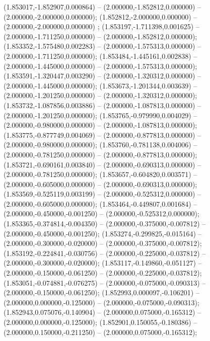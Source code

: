  (1.853017,-1.852907,0.000864) -- (2.000000,-1.852812,0.000000) -- (2.000000,-2.000000,0.000000);
 (1.852812,-2.000000,0.000000) -- (2.000000,-2.000000,0.000000) ;
 (1.853197,-1.711398,0.001625) -- (2.000000,-1.711250,0.000000) -- (2.000000,-1.852812,0.000000);
 (1.853352,-1.575480,0.002283) -- (2.000000,-1.575313,0.000000) -- (2.000000,-1.711250,0.000000);
 (1.853484,-1.445161,0.002838) -- (2.000000,-1.445000,0.000000) -- (2.000000,-1.575313,0.000000);
 (1.853591,-1.320447,0.003290) -- (2.000000,-1.320312,0.000000) -- (2.000000,-1.445000,0.000000);
 (1.853673,-1.201344,0.003639) -- (2.000000,-1.201250,0.000000) -- (2.000000,-1.320312,0.000000);
 (1.853732,-1.087856,0.003886) -- (2.000000,-1.087813,0.000000) -- (2.000000,-1.201250,0.000000);
 (1.853765,-0.979990,0.004029) -- (2.000000,-0.980000,0.000000) -- (2.000000,-1.087813,0.000000);
 (1.853775,-0.877749,0.004069) -- (2.000000,-0.877813,0.000000) -- (2.000000,-0.980000,0.000000);
 (1.853760,-0.781138,0.004006) -- (2.000000,-0.781250,0.000000) -- (2.000000,-0.877813,0.000000);
 (1.853721,-0.690161,0.003840) -- (2.000000,-0.690313,0.000000) -- (2.000000,-0.781250,0.000000);
 (1.853657,-0.604820,0.003571) -- (2.000000,-0.605000,0.000000) -- (2.000000,-0.690313,0.000000);
 (1.853569,-0.525119,0.003199) -- (2.000000,-0.525312,0.000000) -- (2.000000,-0.605000,0.000000);
 (1.853464,-0.449807,0.001684) -- (2.000000,-0.450000,-0.001250) -- (2.000000,-0.525312,0.000000);
 (1.853365,-0.374814,-0.004350) -- (2.000000,-0.375000,-0.007812) -- (2.000000,-0.450000,-0.001250);
 (1.853274,-0.299825,-0.015164) -- (2.000000,-0.300000,-0.020000) -- (2.000000,-0.375000,-0.007812);
 (1.853192,-0.224841,-0.030756) -- (2.000000,-0.225000,-0.037812) -- (2.000000,-0.300000,-0.020000);
 (1.853117,-0.149860,-0.051127) -- (2.000000,-0.150000,-0.061250) -- (2.000000,-0.225000,-0.037812);
 (1.853051,-0.074881,-0.076275) -- (2.000000,-0.075000,-0.090313) -- (2.000000,-0.150000,-0.061250);
 (1.852993,0.000097,-0.106201) -- (2.000000,0.000000,-0.125000) -- (2.000000,-0.075000,-0.090313);
 (1.852943,0.075076,-0.140904) -- (2.000000,0.075000,-0.165312) -- (2.000000,0.000000,-0.125000);
 (1.852901,0.150055,-0.180386) -- (2.000000,0.150000,-0.211250) -- (2.000000,0.075000,-0.165312);

